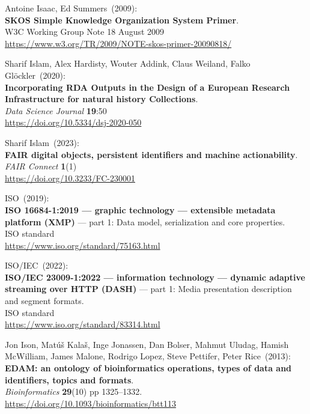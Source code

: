 \begin{thebibliography}{9}
Antoine Isaac, Ed Summers~(2009): \\
\textbf{SKOS Simple Knowledge Organization System Primer}. \\
W3C Working Group Note 18 August 2009 \\
\url{https://www.w3.org/TR/2009/NOTE-skos-primer-20090818/}

Sharif Islam, Alex Hardisty, Wouter Addink, Claus Weiland, Falko Glöckler~(2020): \\
\textbf{Incorporating RDA Outputs in the Design of a European Research Infrastructure for natural history Collections}.\\
\emph{Data Science Journal} \textbf{19}:50\\
\url{https://doi.org/10.5334/dsj-2020-050}

Sharif Islam~(2023): \\
\textbf{FAIR digital objects, persistent identifiers and machine actionability}. \\
\emph{FAIR Connect} \textbf{1}(1) \\
\url{https://doi.org/10.3233/FC-230001}

ISO~(2019): \\
\textbf{{ISO} 16684-1:2019 --- graphic technology --- extensible metadata platform (XMP)} --- part 1: Data model, serialization and core properties.\\
ISO standard\\
\url{https://www.iso.org/standard/75163.html}

ISO/IEC~(2022): \\
\textbf{{ISO}/{IEC} 23009-1:2022 --- information technology ---
dynamic adaptive streaming over HTTP (DASH)} --- part 1: Media
presentation description and segment formats.\\
ISO standard\\
\url{https://www.iso.org/standard/83314.html}


Jon Ison, Matúš Kalaš, Inge Jonassen, Dan Bolser, Mahmut
Uludag, Hamish McWilliam, James Malone, Rodrigo Lopez, Steve Pettifer,
Peter Rice~(2013): \\
\textbf{EDAM: an ontology of bioinformatics operations, types of data
and identifiers, topics and formats}.\\
\emph{Bioinformatics} \textbf{29}(10) pp 1325--1332.\\
\url{https://doi.org/10.1093/bioinformatics/btt113}


\end{thebibliography}
